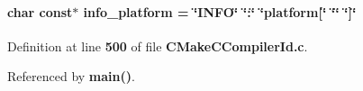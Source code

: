 \paragraph[{info\+\_\+platform}]{\setlength{\rightskip}{0pt plus 5cm}char const$\ast$ info\+\_\+platform = \char`\"{}I\+N\+FO\char`\"{} \char`\"{}\+:\char`\"{} \char`\"{}platform[\char`\"{} \char`\"{}\char`\"{} \char`\"{}]\char`\"{}}\label{soapysdr_2build_2CMakeFiles_23_85_81_2CompilerIdC_2CMakeCCompilerId_8c_a2321403dee54ee23f0c2fa849c60f7d4}


Definition at line {\bf 500} of file {\bf C\+Make\+C\+Compiler\+Id.\+c}.



Referenced by {\bf main()}.


